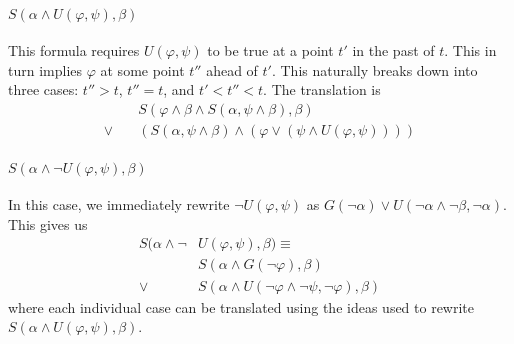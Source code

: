 \documentclass[a4paper,UKenglish,cleveref, autoref, thm-restate, numberwithinsect]{lipics-v2021}
\begin{document}
\paragraph*{$S(\alpha \land U(\varphi, \psi), \beta)$}
This formula requires $U(\varphi, \psi)$ to be true at a point $t'$ in the past of $t$. This in turn implies $\varphi$ at some point $t''$ ahead of $t'$. This naturally breaks down into three cases: $t'' > t$, $t'' = t$, and $t' < t'' < t$. The translation is
\begin{equation*}
    \begin{aligned}
        &S(\varphi \land \beta \land S(\alpha, \psi \land \beta), \beta)\\
        \lor \quad &\left(S(\alpha, \psi \land \beta) \land \left(\varphi \lor \left(\psi \land U(\varphi, \psi) \right) \right) \right)
    \end{aligned}
\end{equation*}

\paragraph*{$S(\alpha \land \lnot U(\varphi, \psi), \beta)$}
In this case, we immediately rewrite $\lnot U(\varphi, \psi)$ as $G(\lnot \alpha) \lor U(\lnot \alpha \land \lnot \beta, \lnot \alpha)$. This gives us
\begin{equation*}
    \begin{aligned}
        S(\alpha \land \lnot &U(\varphi, \psi), \beta) \equiv\\
        &S(\alpha \land G(\lnot \varphi), \beta) \\
        \lor \quad &S(\alpha \land U(\lnot \varphi \land \lnot \psi, \lnot \varphi), \beta)
    \end{aligned}
\end{equation*}
where each individual case can be translated using the ideas used to rewrite $S(\alpha \land U(\varphi, \psi), \beta)$.
\end{document}
